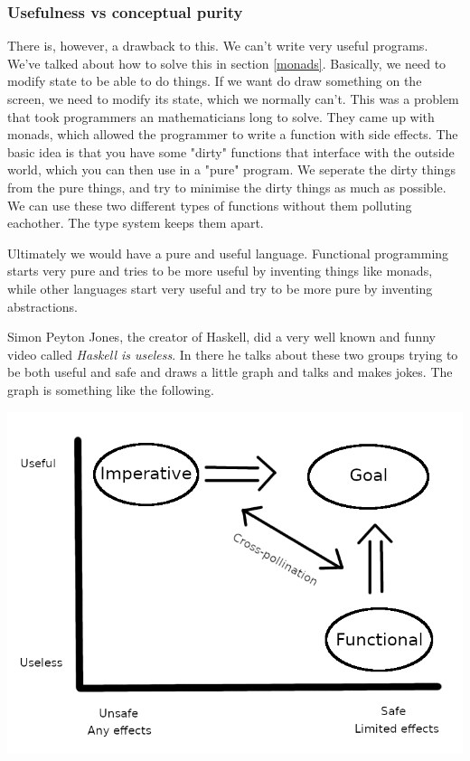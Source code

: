 \documentclass[11pt]{article}
\begin{document}
\subsubsection{Usefulness vs conceptual purity}\label{usefulness}

There is, however, a drawback to this. We can't write very useful programs.
We've talked about how to solve this in section \ref{monads}. Basically, we
need to modify state to be able to do things. If we want do draw something on
the screen, we need to modify its state, which we normally can't. This was a
problem that took programmers an mathematicians long to solve. They came up
with monads, which allowed the programmer to write a function with side
effects. The basic idea is that you have some "dirty" functions that interface
with the outside world, which you can then use in a "pure" program. We seperate
the dirty things from the pure things, and try to minimise the dirty things as
much as possible. We can use these two different types of functions without
them polluting eachother. The type system keeps them apart.

Ultimately we would have a pure and useful language. Functional programming
starts very pure and tries to be more useful by inventing things like monads,
while other languages start very useful and try to be more pure by inventing
abstractions.

Simon Peyton Jones, the creator of Haskell, did a very well known and funny
video called \emph{Haskell is useless}. In there he talks about these two
groups trying to be both useful and safe and draws a little graph and talks and
makes jokes. The graph is something like the following.


\begin{center}
	\includegraphics[scale=1.3]{useless}
\end{center}
\end{document}

